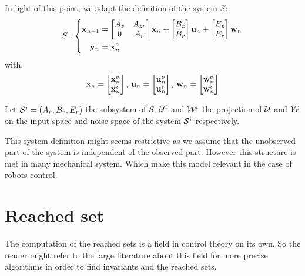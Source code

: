 In light of this point, we adapt the definition of the system $S$:
\begin{equation}
S:
\left\{
\begin{aligned}
 \mathbf{x}_{n+1} &= 
\begin{bmatrix} A_z & A_{zr}\\ 0 & A_r \end{bmatrix}  \mathbf{x}_n
+\begin{bmatrix} B_z \\ B_r \end{bmatrix}  \mathbf{u}_n
+\begin{bmatrix} E_z\\ E_r \end{bmatrix}  \mathbf{w}_n\\
 \mathbf{y}_n &=  \mathbf{x}^o_n
\end{aligned}
\right.
\end{equation}
with,
\begin{align*}
 \mathbf{x}_n = \begin{bmatrix}
 \mathbf{x}^o_n\\
 \mathbf{x}^i_n
\end{bmatrix}
\textrm{, }
 \mathbf{u}_n = \begin{bmatrix}
 \mathbf{u}^o_n\\
 \mathbf{u}^i_n
\end{bmatrix}
\textrm{, }
 \mathbf{w}_n = \begin{bmatrix}
 \mathbf{w}^o_n\\
 \mathbf{w}^i_n
\end{bmatrix}
\end{align*}

Let $\mathcal{S}^i=(A_r,B_r,E_r)$ the subsystem of $S$, ${\mathcal{U}^i}$ and ${\mathcal{W}^i}$ the projection of $\mathcal{U}$ and $\mathcal{W}$ on the input space and noise space of the system $\mathcal{S}^i$ respectively.

This system definition might seems restrictive as we assume that the unobserved part of the system is independent of the observed part.
However this structure is met in many mechanical system.
Which make this model relevant in the case of robots control.

\section{Reached set}
The computation of the reached sets is a field in control theory on its own.
So the reader might refer to the large literature about this field for more precise algorithms in order to find invariants and the reached sets.

